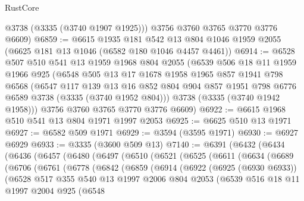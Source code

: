 \begin{lexlean}{RustCore}
\begin{coremodule}
        @3738
        (@3335 (@3740 @1907 @1925)))
      @3756
      @3760
      @3765
      @3770
      @3776
      @6609)
@6859 := @6615
    @1935
    @181
    @542
    @13
    @804
    @1046
    @1959
    @2055
    (@6625 @181 @13 @1046 (@6582 @180 @1046 @4457 @4461))
@6914 := @6528
    @507
    @510
    @541
    @13
    @1959
    @1968
    @804
    @2055
    (@6539
      @506
      @18
      @11
      @1959
      @1966
      @925
      (@6548
        @505
        @13
        @17
        @1678
        @1958
        @1965
        @857
        @1941
        @798
        @6568
        (@6547
          @117
          @139
          @13
          @16
          @852
          @804
          @904
          @857
          @1951
          @798
          @6776
          @6589
          @3738
          (@3335 (@3740 @1952 @804)))
        @3738
        (@3335 (@3740 @1942 @1958)))
      @3756
      @3760
      @3765
      @3770
      @3776
      @6609)
@6922 := @6615 @1968 @510 @541 @13 @804 @1971 @1997 @2053
@6925 := @6625 @510 @13 @1971
@6927 := @6582 @509 @1971
@6929 := @3594 (@3595 @1971)
@6930 := @6927 @6929
@6933 := @3335 (@3600 @509 @13)
@7140 := @6391
    (@6432
      (@6434
        (@6436
          (@6457
            (@6480
              (@6497
                (@6510
                  (@6521
                    (@6525
                      (@6611
                        (@6634
                          (@6689
                            (@6706
                              (@6761
                                (@6778
                                  (@6842
                                    (@6859
                                      (@6914
                                        (@6922
                                          (@6925 (@6930 @6933))
                                          (@6528
                                            @517
                                            @355
                                            @540
                                            @13
                                            @1997
                                            @2006
                                            @804
                                            @2053
                                            (@6539
                                              @516
                                              @18
                                              @11
                                              @1997
                                              @2004
                                              @925
                                              (@6548

\end{coremodule}
\end{lexlean}
